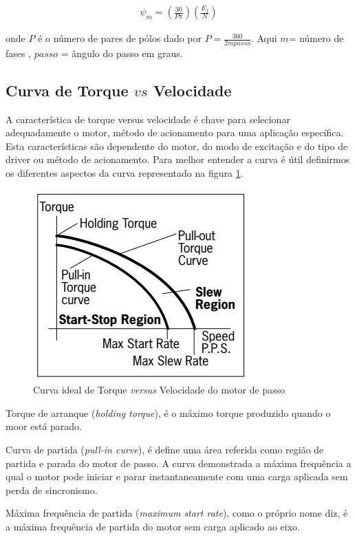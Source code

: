 \begin{eqnarray}
\label{eq:eq11a}
\psi_m = \left(\frac{30}{P \pi}\right) \left(\frac{E_f}{N}\right)
\end{eqnarray}

onde $P$ é o número de pares de pólos dado por $P = \frac{360}{2mpasso}$. Aqui $m$= número de fases , $passo$ = ângulo do passo em graus.


\subsection{Curva de Torque $vs$ Velocidade}
A característica de torque versus velocidade é chave para selecionar adequadamente o motor, método de acionamento para uma aplicação específica. Esta características são dependente do motor, do modo de excitação e do tipo de driver ou método de acionamento. Para melhor entender a curva é útil definirmos os diferentes aspectos da curva representado na figura \ref{fig:fig3}.

\begin{figure}[H]
	\centering
	\includegraphics[scale=.60]{Images/curvatorquevelocidade_HSM.PNG}
	\caption{ Curva ideal de Torque \textit{versus} Velocidade do motor de passo }
	\label{fig:fig3}
\end{figure}
Torque de arranque (\textit{holding torque}), é o máximo torque produzido quando o moor está parado.

Curva de partida (\textit{pull-in curve}), é define uma área referida como região de partida e parada do motor de passo. A curva demonstrada a máxima frequência a qual o motor pode iniciar e parar instantaneamente com uma carga aplicada sem perda de sincronismo.

Máxima frequência de partida (\textit{maximum start rate}), como o próprio nome diz, é a máxima frequência de partida do motor sem carga aplicado ao eixo.

